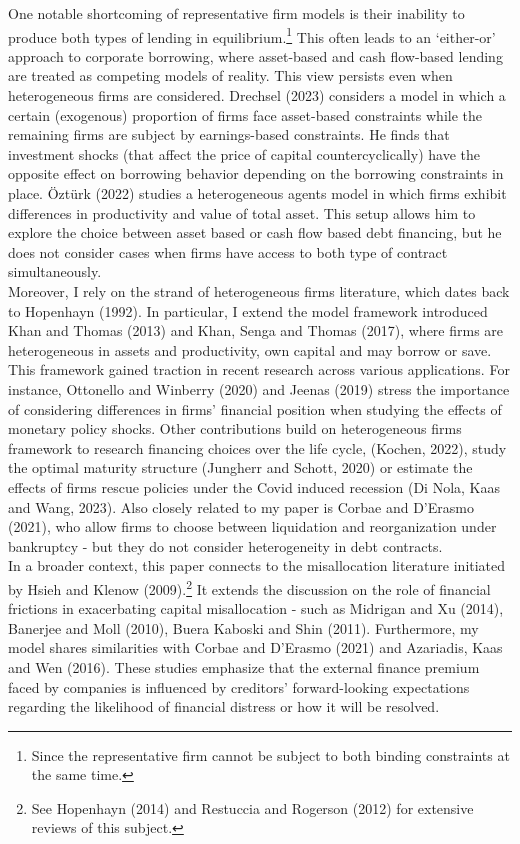 \documentclass[12pt]{article}
\begin{document}
One notable shortcoming of representative firm models is their inability to produce both types of lending in equilibrium.\footnote{Since the representative firm cannot be subject to both binding constraints at the same time.} This often leads to an `either-or' approach to corporate borrowing, where asset-based and cash flow-based lending are treated as competing models of reality. This view persists even when heterogeneous firms are considered. Drechsel (2023) considers a model in which a certain (exogenous) proportion of firms face asset-based constraints while the remaining firms are subject by earnings-based constraints. He finds that investment shocks (that affect the price of capital countercyclically) have the opposite effect on borrowing behavior depending on the borrowing constraints in place. Öztürk (2022) studies a heterogeneous agents model in which firms exhibit differences in productivity and value of total asset. This setup allows him to explore the choice between asset based or cash flow based debt financing, but he does not consider cases when firms have access to both type of contract simultaneously. \vspace{3mm} \\ 
Moreover, I rely on the strand of heterogeneous firms literature, which dates back to Hopenhayn (1992). In particular, I extend the model framework introduced Khan and Thomas (2013) and Khan, Senga and Thomas (2017), where firms are heterogeneous in assets and productivity, own capital and may borrow or save. This framework gained traction in recent research across various applications. For instance, Ottonello and Winberry (2020) and Jeenas (2019) stress the importance of considering differences in firms' financial position when studying the effects of monetary policy shocks. Other contributions build on heterogeneous firms framework to research financing choices over the life cycle, (Kochen, 2022), study the optimal maturity structure (Jungherr and Schott, 2020) or estimate the effects of firms rescue policies under the Covid induced recession (Di Nola, Kaas and Wang, 2023). Also closely related to my paper is Corbae and D'Erasmo (2021), who allow firms to choose between liquidation and reorganization under bankruptcy - but they do not consider heterogeneity in debt contracts.  \vspace{3mm} \\
In a broader context, this paper connects to the misallocation literature initiated by Hsieh and Klenow (2009).\footnote{See Hopenhayn (2014) and Restuccia and Rogerson (2012) for extensive reviews of this subject.} It extends the discussion on the role of financial frictions in exacerbating capital misallocation - such as Midrigan and Xu (2014), Banerjee and Moll (2010), Buera Kaboski and Shin (2011). Furthermore, my model shares similarities with Corbae and D'Erasmo (2021) and Azariadis, Kaas and Wen (2016). These studies emphasize that the external finance premium faced by companies is influenced by creditors' forward-looking expectations regarding the likelihood of financial distress or how it will be resolved. 
\end{document}
